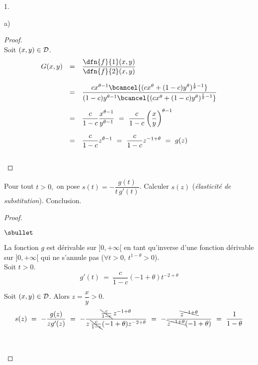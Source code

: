 \documentclass[11pt]{article}%
\begin{document}
\begin{noliste}{1.}
\begin{noliste}{a)}
  \begin{proof}~\\
   Soit $(x,y) \in {\cal D}$.
   \[
    \begin{array}{rcl}
     G(x,y) &=& \dfrac{\dfn{f}{1}(x,y)}{\dfn{f}{2}(x,y)}
     \\[.6cm]
     &=& \dfrac{c x^{\theta-1} \bcancel{(c x^\theta + (1-c) y^\theta)^{
     \frac{1}{\theta}-1}}}{(1-c) y^{\theta-1}\bcancel{(c x^\theta + 
     (1-c) y^\theta)^{\frac{1}{\theta}-1}}}
     \\[.6cm]
     &=& \dfrac{c}{1-c} \dfrac{x^{\theta-1}}{y^{\theta-1}}
     \ = \ \dfrac{c}{1-c} \left(\dfrac{x}{y}\right)^{\theta-1}
     \\[.6cm]
     &=& \dfrac{c}{1-c} z^{\theta-1}
     \ = \ \dfrac{c}{1-c} z^{-1+\theta}
     \ = \ g(z)
    \end{array}
   \]
   ~\\[-1cm]
  \end{proof}

  
  \item\label{3b} Pour tout $t>0,$ on pose $s(t)=-\dfrac{g(t)}{t 
  \, g'(t)}$.
  Calculer $s(z)$ ({\it élasticité de substitution}). Conclusion.
  
  \begin{proof}~
   \begin{noliste}{$\sbullet$}
    \item La fonction $g$ est dérivable sur $]0,+\infty[$ en tant
    qu'inverse d'une fonction dérivable sur $]0,+\infty[$ qui ne 
    s'annule pas
    ($\forall t>0$, $t^{1-\theta} >0$).\\
    Soit $t>0$.
    \[
     g'(t) \ = \ \dfrac{c}{1-c}(-1+\theta) t^{-2+\theta}
    \]
    
    \item Soit $(x,y)\in {\cal D}$. Alors $z=\dfrac{x}{y}>0$.
    \[
     s(z) \ = \ -\dfrac{g(z)}{zg'(z)} \ = \ 
     -\dfrac{\bcancel{\frac{c}{1-c}} \, z^{-1+\theta}}
     {z \, \bcancel{\frac{c}{1-c}} (-1+\theta) z^{-2+\theta}}
     \ = \ - \dfrac{\bcancel{z^{-1+\theta}}}
     {\bcancel{z^{-1+\theta}} (-1+\theta)}
     \ = \ \dfrac{1}{1-\theta}
    \]
    
    ~\\[-1.4cm]
   \end{noliste}
  \end{proof}
 \end{noliste}
 

\end{noliste}
\end{document}
